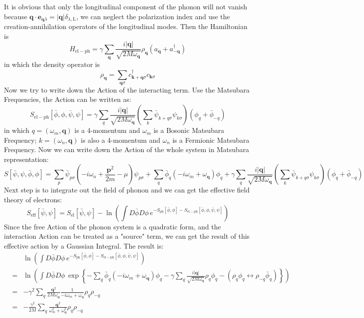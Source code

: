 \documentclass{article}
\newcommand{\mtp}{\mathbf{p}}
\newcommand{\mtq}{\mathbf{q}}
\newcommand{\mtk}{\mathbf{k}}
\begin{document}
It is obvious that only the longitudinal component of the phonon will not vanish because $\mtq\cdot\mathbf{e}_{\mtq\lambda} = |\mtq|\delta_{\lambda,\mathrm{L}} $, we can neglect the polarization index and use the creation-annihilation operators of the longitudinal modes. Then the Hamiltonian is
\begin{equation}
H_{\mathrm{el-ph}} = \gamma \sum_{\mtq}\frac{i|\mtq|}{\sqrt{2M\omega_{\mtq}}} \rho_{\mtq}(a_{\mtq}+ a^\dagger_{-\mtq}) 
\end{equation}
in which the density operator is
$$
\rho_{\mtq} = \sum_{\mtq\sigma} c^\dagger_{\mtk+\mtq\sigma}c_{\mtk\sigma}
$$
Now we try to write down the Action of the interacting term. Use the Matsubara Frequencies, the Action can be written as:
\begin{equation}
S_{\mathrm{el-ph}}[\bar{\phi},\phi,\bar{\psi},\psi] = \gamma \sum_{q}\frac{i|\mtq|}{\sqrt{2M\omega_\mtq}}\left(\sum_k \bar{\psi}_{k+q\sigma}\psi_{k\sigma} \right)(\phi_{q}+ \bar{\phi}_{-q}) 
\end{equation}
in which $q = (\omega_m, \mtq)$ is a 4-momentum and $\omega_m$ is a Bosonic Matsubara Frequency; $k = (\omega_n,\mtq)$ is also a 4-momentum and $\omega_n$ is a Fermionic Matsubara Frequency. Now we can write down the Action of the whole system in Matsubara representation:
\begin{equation}
S[\bar{\psi},\psi,\bar{\phi},\phi] = \sum_{p}\bar{\psi}_{p\sigma}\left(-i\omega_n +\frac{\mtp^2}{2m}-\mu\right)\psi_{p\sigma} + \sum_q \bar{\phi}_q(-i\omega_m+\omega_\mtq)\phi_q +  \gamma \sum_{q}\frac{i|\mtq|}{\sqrt{2M\omega_\mtq}}\left(\sum_k \bar{\psi}_{k+q\sigma}\psi_{k\sigma} \right)(\phi_{q}+ \bar{\phi}_{-q}) 
\end{equation}
Next step is to integrate out the field of phonon and we can get the effective field theory of electrons:
\begin{equation}
S_{\mathrm{eff}}[\bar{\psi},\psi] = S_{\mathrm{el}}[\bar{\psi},\psi] - \ln{\left(\int D\bar{\phi}D\phi\,e^{-S_{\mathrm{ph}}[\bar{\phi},\phi]-S_{\mathrm{el-ph}}[\bar{\phi},\phi,\bar{\psi},\psi]}\right)}
\end{equation}
Since the free Action of the phonon system is a quadratic form, and the interaction Action can be treated as a "source" term, we can get the result of this effective action by a Gaussian Integral. The result is:
\begin{eqnarray}
& & \ln\left(\int D\bar\phi D\phi\,e^{-S_{\mathrm{ph}}[\bar{\phi},\phi]-S_{\mathrm{el-ph}}[\bar{\phi},\phi,\bar{\psi},\psi]}\right)\nonumber\\
&=& \ln\left(\int D\bar\phi D\phi\, \exp\left\{- \sum_q \bar{\phi}_q(-i\omega_m+\omega_\mtq)\phi_q - \gamma\sum_q \frac{i|\mtq|}{\sqrt{2M\omega_\mtq}}\rho_q\phi_q - (\rho_q\phi_q\leftrightarrow\rho_{-q}\bar{\phi}_{q}) \right\}\right)\nonumber\\
&=& - \gamma^2 \sum_q \frac{\mtq^2}{2M\omega_\mtq}\frac{1}{-i\omega_m+ \omega_\mtq}\rho_q\rho_{-q}\nonumber\\
&=& -\frac{\gamma^2}{2M}\sum_q \frac{\mtq^2}{\omega_m^2 + \omega_\mtq^2}\rho_q\rho_{-q}
\end{eqnarray}
\end{document}
